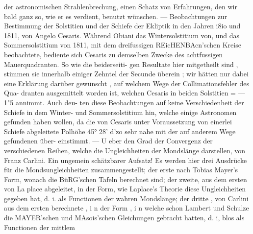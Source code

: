 \documentclass[12pt,a4paper]{article}
\begin{document}
der astronomischen Strahlenbrechung, einen Schatz von Erfahrungen, den wir bald ganz so, wie er es\newline
verdient, benutzt wünschen. --- Beobachtungen zur Bestimmung der Solstitien und der Schiefe der\newline
Ekliptik in den Jahren i8io und 1811, von Angelo Cesaris. Während Obiani das Wintersolstitium von, und das Sommersolstitium von 1811, mit dem dreifussigen REicHENBAcn'schen Kreise beobachtete,\newline
bediente sich Cesaris zu demselben Zwecke des achtfussigen Mauerquadranten. So wie die beiderseiti-\newline
gen Resultate hier mitgetheilt sind , stimmen sie innerhalb einiger Zehntel der Secunde überein ; wir\newline
hätten nur dabei eine Erklärung darüber gewünscht , auf welchem Wege der Collimationsfehler des Qua-\newline
dranten ausgemittelt worden ist, welchen Cesaris in beiden Solstitien = --- 1"5 annimmt. Auch deu-\newline
ten diese Beobachtungen auf keine Verschiedenheit der Schiefe in dem Winter- und Sommersolstitium\newline
hin, welche einige Astronomen gefunden haben wollen, da die von Cesaris unter Voraussetzung von\newline
einerlei Schiefe abgeleitete Polhöhe 45° 28' d'zo sehr nahe mit der auf anderem Wege gefundenen über-\newline
einstimmt. --- U eber den Grad der Convergenz der verschiedenen Reihen, welche die Ungleichheiten\newline
der Mondslänge darstellen, von Franz Carlini. Ein ungemein schätzbarer Aufsatz! Es werden hier drei\newline
Ausdrücke für die Mondsungleichheiten zusammengestellt; der erste nach Tobias Mayer's Form, wonach\newline
die BüRG'schen Tafeln berechnet sind; der zweite, aus dem ersten von La place abgeleitet, in der Form,\newline
wie Laplace's Theorie diese Ungleichheiten gegeben hat, d. i. als Functionen der wahren Mondslänge;\newline
der dritte , von Carlini aus dem ersten berechnete , i n der Form , i n welche schon Lambert und Schulze\newline
die MAYER'schen und MAsois'schen Gleichungen gebracht hatten, d. i, blos als Functionen der mittlem\newline
\end{document}
